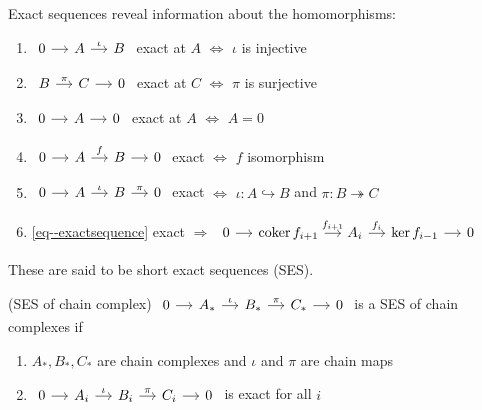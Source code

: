 \documentclass[a4paper,11pt]{article}
\begin{document}
				\begin{eg}Exact sequences reveal information about the homomorphisms:
					\begin{enumerate}
						\item $\begin{tikzcd}[column sep=small]
						0\ar[r]& A\ar[r,"\iota"]& B
						\end{tikzcd}$ exact at $A$ $\Longleftrightarrow$ $\iota$ is injective
						\item $\begin{tikzcd}[column sep=small]B\ar[r,"\pi"]& C\ar[r]& 0\end{tikzcd}$ exact at $C$ $\Longleftrightarrow$ $\pi$ is surjective
						\item $\begin{tikzcd}[column sep=small]
							0\ar[r]& A\ar[r]& 0
						\end{tikzcd}$ exact at $A$ $\Longleftrightarrow$ $A=0$ 
						\item $\begin{tikzcd}[column sep=small]
							0\ar[r]& A\ar[r,"f"]& B\ar[r]& 0
						\end{tikzcd}$ exact $\Longleftrightarrow$ $f$ isomorphism
						\item $\begin{tikzcd}[column sep=small]
							0\ar[r]& A\ar[r,"\iota"]& B\ar[r,"\pi"]& 0
						\end{tikzcd}$ exact $\Longleftrightarrow$ $\iota:A\hookrightarrow B$ and $\pi:B\twoheadrightarrow C$
						\item \eqref{eq--exactsequence} exact $\Longrightarrow$ $\begin{tikzcd}[column sep=small]
							0\ar[r]& \coker f_{i+1}\ar[r,"f_{i+1}"]& A_i\ar[r,"f_i"]& \ker f_{i-1}\ar[r]& 0
						\end{tikzcd}$
					\end{enumerate}
					These are said to be short exact sequences (SES).
				\end{eg}

				\begin{defi}
					(SES of chain complex) $\begin{tikzcd}[column sep=small]
						0\ar[r]& A_\ast\ar[r,"\iota"]& B_\ast\ar[r,"\pi"]& C_\ast\ar[r]& 0 
					\end{tikzcd}$ is a SES of chain complexes if
					\begin{enumerate}
						\item $A_\ast,B_\ast,C_\ast$ are chain complexes and $\iota$ and $\pi$ are chain maps
						\item $\begin{tikzcd}[column sep=small]
							0\ar[r]& A_i\ar[r,"\iota"]& B_i\ar[r,"\pi"]& C_i\ar[r]& 0 
						\end{tikzcd}$ is exact for all $i$
					\end{enumerate}
				\end{defi}
\end{document}
